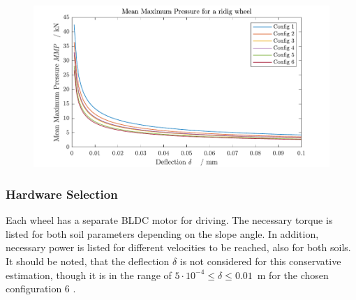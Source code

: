 \begin{figure}[htb] 
  \centering
     \includegraphics[width=1\textwidth]{Media/MMP for each Config.pdf}
  \caption{}
  \label{fig:MMP}
\end{figure}

\subsubsection*{Hardware Selection}
\label{app:Hardware}

Each wheel has a separate BLDC motor for driving. The necessary torque is listed for both soil parameters depending on the slope angle. In addition, necessary power is listed for different velocities to be reached, also for both soils. It should be noted, that the deflection \(\delta\) is not considered for this conservative estimation, though it is in the range of \(5\cdot 10^{-4} \leq \delta \leq 0.01\)~m for the chosen configuration 6 .

